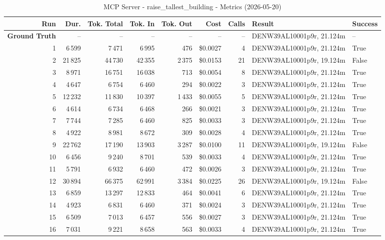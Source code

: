 \documentclass[a4paper,11pt]{article}
\begin{document}
\begin{table}[ht]
\centering
\scriptsize
\caption{MCP Server - raise\_tallest\_building - Metrics (2026-05-20)}
\label{tab:mcp\_raise\_tallest\_building\_metrics\_2026-05-20}
\begin{tabular}{r r r r r r r p{3cm} l}
\hline
Run & Dur. & Tok. Total & Tok. In & Tok. Out & Cost & Calls & Result & Success \\
\hline
\textbf{Ground Truth} & -- & -- & -- & -- & -- & -- & DENW39AL10001p9r, 21.124m & -- \\
\hline
1 & 6\,599 & 7\,471 & 6\,995 & 476 & \$0.0027 & 4 & DENW39AL10001p9r, 21.124m & True \\
2 & 21\,825 & 44\,730 & 42\,355 & 2\,375 & \$0.0153 & 21 & DENW39AL10001p9r, 19.124m & False \\
3 & 8\,971 & 16\,751 & 16\,038 & 713 & \$0.0054 & 8 & DENW39AL10001p9r, 21.124m & True \\
4 & 4\,647 & 6\,754 & 6\,460 & 294 & \$0.0022 & 3 & DENW39AL10001p9r, 21.124m & True \\
5 & 12\,232 & 11\,830 & 10\,397 & 1\,433 & \$0.0055 & 5 & DENW39AL10001p9r, 21.124m & True \\
6 & 4\,614 & 6\,734 & 6\,468 & 266 & \$0.0021 & 3 & DENW39AL10001p9r, 21.124m & True \\
7 & 7\,744 & 7\,285 & 6\,460 & 825 & \$0.0033 & 3 & DENW39AL10001p9r, 21.124m & True \\
8 & 4\,922 & 8\,981 & 8\,672 & 309 & \$0.0028 & 4 & DENW39AL10001p9r, 21.124m & True \\
9 & 22\,762 & 17\,190 & 13\,903 & 3\,287 & \$0.0100 & 11 & DENW39AL10001p9r, 19.124m & False \\
10 & 6\,456 & 9\,240 & 8\,701 & 539 & \$0.0033 & 4 & DENW39AL10001p9r, 21.124m & True \\
11 & 5\,791 & 6\,932 & 6\,460 & 472 & \$0.0026 & 3 & DENW39AL10001p9r, 21.124m & True \\
12 & 30\,894 & 66\,375 & 62\,991 & 3\,384 & \$0.0225 & 26 & DENW39AL10001p9r, 19.124m & False \\
13 & 6\,859 & 13\,297 & 12\,833 & 464 & \$0.0041 & 6 & DENW39AL10001p9r, 21.124m & True \\
14 & 4\,923 & 6\,831 & 6\,460 & 371 & \$0.0024 & 3 & DENW39AL10001p9r, 21.124m & True \\
15 & 6\,509 & 7\,013 & 6\,457 & 556 & \$0.0027 & 3 & DENW39AL10001p9r, 21.124m & True \\
16 & 7\,031 & 9\,221 & 8\,658 & 563 & \$0.0033 & 4 & DENW39AL10001p9r, 21.124m & True \\

\end{tabular}
\end{table}
\end{document}
